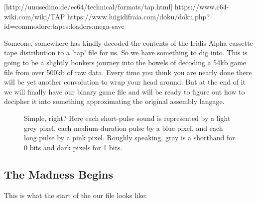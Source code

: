 [http://unusedino.de/ec64/technical/formats/tap.html]
https://www.c64-wiki.com/wiki/TAP
https://www.luigidifraia.com/doku/doku.php?id=commodore:tapes:loaders:mega-save

Someone, somewhere has kindly decoded the contents of the Iridis Alpha cassette tape distribution to
a 'tap' file for us. So we have something to dig into. This is going to be a slightly bonkers journey
into the bowels of decoding a 54kb game file from over 500kb of raw data. Every time you think you
are nearly done there will be yet another convolution to wrap your head around. But at the end of it
we will finally have our binary game file and will be ready to figure out how to decipher it into something
approximating the original assembly langage.

\begin{figure}[H]
  {
    \begin{adjustbox}{width=10cm,center}
    \end{adjustbox}
  }\caption[]{Simple, right? Here each short-pulse sound is represented by a light grey pixel, each medium-duration pulse by a blue pixel,
and each long pulse by a pink pixel. Roughly speaking, gray is a shorthand for 0 bits and dark pixels for 1 bits.}
\end{figure}

\subsection{The Madness Begins}

This is what the start of the our  file looks like:


